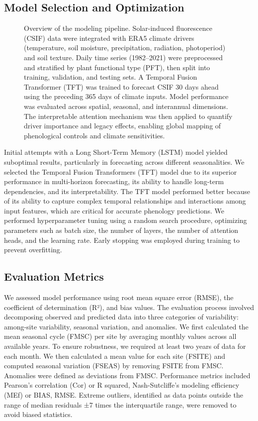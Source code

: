 \documentclass[pdflatex,sn-mathphys-num]{sn-jnl}%
\theoremstyle{thmstyleone}%
\theoremstyle{thmstyletwo}%
\theoremstyle{thmstylethree}%
\begin{document}
\subsection{Model Selection and Optimization}\label{subsec2}

\begin{figure}[h!]
        \centering
        
        \caption{Overview of the modeling pipeline. Solar-induced fluorescence (CSIF) data were integrated with ERA5 climate drivers (temperature, soil moisture, precipitation, radiation, photoperiod) and soil texture. Daily time series (1982–2021) were preprocessed and stratified by plant functional type (PFT), then split into training, validation, and testing sets. A Temporal Fusion Transformer (TFT) was trained to forecast CSIF 30 days ahead using the preceding 365 days of climate inputs. Model performance was evaluated across spatial, seasonal, and interannual dimensions. The interpretable attention mechanism was then applied to quantify driver importance and legacy effects, enabling global mapping of phenological controls and climate sensitivities.}
        \label{fig:pipeline}
    \end{figure}
Initial attempts with a Long Short-Term Memory (LSTM) model yielded suboptimal results, particularly in forecasting across different seasonalities. We selected the Temporal Fusion Transformers (TFT) model due to its superior performance in multi-horizon forecasting, its ability to handle long-term dependencies, and its interpretability\cite{lim_temporal_2019}. The TFT model performed better because of its ability to capture complex temporal relationships and interactions among input features, which are critical for accurate phenology predictions.
We performed hyperparameter tuning using a random search procedure, optimizing parameters such as batch size, the number of layers, the number of attention heads, and the learning rate. Early stopping was employed during training to prevent overfitting.

\subsection{Evaluation Metrics}\label{subsec2}
We assessed model performance using root mean square error (RMSE), the coefficient of determination (R²), and bias values. The evaluation process involved decomposing observed and predicted data into three categories of variability: among-site variability, seasonal variation, and anomalies. We first calculated the mean seasonal cycle (FMSC) per site by averaging monthly values across all available years. To ensure robustness, we required at least two years of data for each month. We then calculated a mean value for each site (FSITE) and computed seasonal variation (FSEAS) by removing FSITE from FMSC. Anomalies were defined as deviations from FMSC. Performance metrics included Pearson’s correlation (Cor) or R squared, Nash-Sutcliffe’s modeling efficiency (MEf) or BIAS, RMSE. Extreme outliers, identified as data points outside the range of median residuals ±7 times the interquartile range, were removed to avoid biased statistics.
\end{document}
